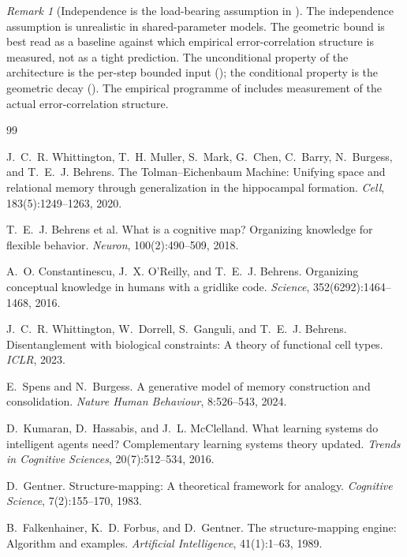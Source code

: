 \documentclass[11pt,a4paper]{article}
\theoremstyle{plain}
\theoremstyle{definition}
\theoremstyle{remark}
\newtheorem{remark}[theorem]{Remark}
\begin{document}
\begin{remark}[Independence is the load-bearing assumption in ]
\label{rem:independence}
The independence assumption is unrealistic in shared-parameter models. The geometric bound is best read as a baseline against which empirical error-correlation structure is measured, not as a tight prediction. The unconditional property of the architecture is the per-step bounded input (); the conditional property is the geometric decay (). The empirical programme of  includes measurement of the actual error-correlation structure.
\end{remark}

\begin{thebibliography}{99}

J.~C.~R. Whittington, T.~H. Muller, S.~Mark, G.~Chen, C.~Barry, N.~Burgess, and T.~E.~J. Behrens.
The Tolman--Eichenbaum Machine: Unifying space and relational memory through generalization in the hippocampal formation.
\emph{Cell}, 183(5):1249--1263, 2020.

T.~E.~J. Behrens et al.
What is a cognitive map? Organizing knowledge for flexible behavior.
\emph{Neuron}, 100(2):490--509, 2018.

A.~O. Constantinescu, J.~X. O'Reilly, and T.~E.~J. Behrens.
Organizing conceptual knowledge in humans with a gridlike code.
\emph{Science}, 352(6292):1464--1468, 2016.

J.~C.~R. Whittington, W.~Dorrell, S.~Ganguli, and T.~E.~J. Behrens.
Disentanglement with biological constraints: A theory of functional cell types.
\emph{ICLR}, 2023.

E.~Spens and N.~Burgess.
A generative model of memory construction and consolidation.
\emph{Nature Human Behaviour}, 8:526--543, 2024.

D.~Kumaran, D.~Hassabis, and J.~L. McClelland.
What learning systems do intelligent agents need? Complementary learning systems theory updated.
\emph{Trends in Cognitive Sciences}, 20(7):512--534, 2016.

D.~Gentner.
Structure-mapping: A theoretical framework for analogy.
\emph{Cognitive Science}, 7(2):155--170, 1983.

B.~Falkenhainer, K.~D. Forbus, and D.~Gentner.
The structure-mapping engine: Algorithm and examples.
\emph{Artificial Intelligence}, 41(1):1--63, 1989.


\end{thebibliography}
\end{document}
